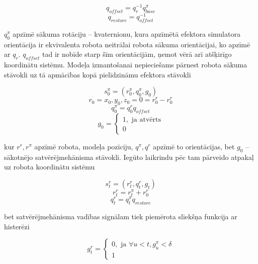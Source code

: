 \documentclass[12pt, a4paper]{article}
\numberwithin{equation}{section} %
\begin{document}
\begin{equation}
    q_{offset} = q_r^{-1}q^{\pi}_{base}
\end{equation}
\begin{equation}
    q_{restore} = q_{offset}^{-1}
\end{equation}

$q^{\pi}_0$ apzīmē sākuma rotāciju -- kvaternionu, kura apzīmētā efektora simulatora orientācija ir ekvivalenta robota neitrālai robota sākuma orientācijai, ko apzīmē ar $q_r$. $q_{offset}$ tad ir nobīde starp šīm orientācijām, ņemot vērā arī atšķirīgo koordinātu sistēmu. Modeļa izmantošanai nepieciešams pārnest robota sākuma stāvokli uz tā apmācības kopā pielīdzināmu efektora stāvokli

\begin{equation}
    s^{\pi}_0 = (r^{\pi}_0, q^{\pi}_0 , g_0)
\end{equation}
\begin{equation}
    r_0 = x_0, y_0, z_0 = 0 = r^r_0 - r^r_0
\end{equation}
\begin{equation}
    q^{\pi}_0 = q^{r}_0q_{offset}
\end{equation}
\begin{equation}
    g_0 = 
    \begin{cases}
        1, \text{ ja atvērts} \\
        0
    \end{cases}
\end{equation}

kur $r^r, r^{\pi}$ apzīmē robota, modeļa pozīciju, $q^{\pi}, q^r$ apzīmē to orientācijas, bet $g_0$ -- sākotnējo satvērējmehānisma stāvokli. Iegūto laikrindu pēc tam pārveido atpakaļ uz robota koordinātu sistēmu 

\begin{equation}
    s^{r}_t = (r^r_t, q^r_t , g_t)
\end{equation}
\begin{equation}
    r^r_t = r^{\pi}_t + r^r_0
\end{equation}
\begin{equation}
    q^r_t = q^{\pi}_tq_{restore}
\end{equation}

bet satvērējmehānisma vadības signālam tiek piemērota sliekšņa funkcija ar histerēzi

\begin{equation}
    g^r_t = 
    \begin{cases}
        0, \text{ ja } \forall u < t, g^{\pi}_u < \delta \\
        1
    \end{cases}
\end{equation}
\end{document}
